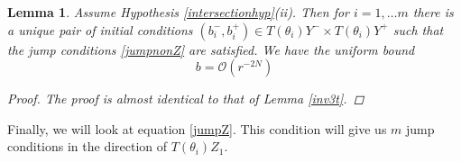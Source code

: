 \documentclass[12pt]{article}
\newtheorem{lemma}{Lemma}
\begin{document}
\begin{lemma}\label{inv3nt}
Assume Hypothesis \ref{intersectionhyp}(ii). Then for $i = 1, \dots m$ there is a unique pair of initial conditions $(b_i^-, b_i^+) \in T(\theta_i) Y^- \times T(\theta_i) Y^+$ such that the jump conditions \eqref{jumpnonZ} are satisfied. We have the uniform bound
\begin{equation}\label{bboundnt}
b = \mathcal{O}(r^{-2N})
\end{equation}
\begin{proof}
The proof is almost identical to that of Lemma \ref{inv3t}.
\end{proof}
\end{lemma}

Finally, we will look at equation \ref{jumpZ}. This condition will give us $m$ jump conditions in the direction of $T(\theta_i) Z_1$.
\end{document}
